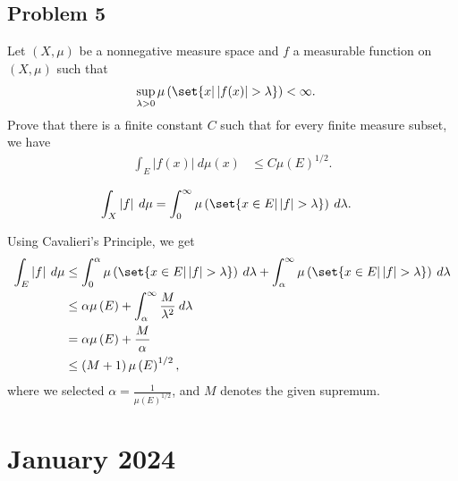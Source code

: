 \documentclass[10pt]{mypackage}
\begin{document}
\subsection{Problem 5}%
\begin{problem}
  Let $\left( X,\mu \right)$ be a nonnegative measure space and $f$ a measurable function on $\left( X,\mu \right)$ such that
  \begin{align*}
    \sup_{\lambda > 0} \mu\left( \set{x | \left\vert f(x) \right\vert > \lambda} \right) &< \infty.
  \end{align*}
  Prove that there is a finite constant $C$ such that for every finite measure subset, we have
  \begin{align*}
    \int_{E}^{} \left\vert f(x) \right\vert\:d\mu(x) &\leq C\mu\left( E \right)^{1/2}.
  \end{align*}
\end{problem}
\begin{lemma}
  \begin{align*}
    \int_{X}^{} \left\vert f \right\vert\:d\mu &= \int_{0}^{\infty} \mu\left( \set{x\in E | \left\vert f \right\vert > \lambda} \right)\:d\lambda.
  \end{align*}
\end{lemma}
Using Cavalieri's Principle, we get
\begin{align*}
  \int_{E}^{} \left\vert f \right\vert\:d\mu &\leq \int_{0}^{\alpha} \mu\left( \set{x\in E | \left\vert f \right\vert > \lambda} \right)\:d\lambda + \int_{\alpha}^{\infty} \mu\left( \set{x\in E | \left\vert f \right\vert > \lambda} \right)\:d\lambda\\
                                             &\leq \alpha\mu\left( E \right) + \int_{\alpha}^{\infty} \frac{M}{\lambda^2}\:d\lambda\\
                                             &= \alpha\mu\left( E \right) + \frac{M}{\alpha}\\
                                             &\leq \left( M+1 \right)\mu\left( E \right)^{1/2},
\end{align*}
where we selected $\alpha = \frac{1}{\mu\left( E \right)^{1/2}}$, and $M$ denotes the given supremum.
\section{January 2024}%
\end{document}
